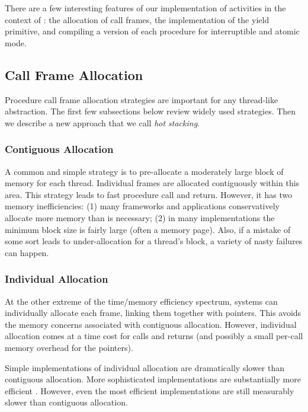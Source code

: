 \documentclass[acmsmall,anonymous,review]{acmart}\settopmatter{printfolios=true,printccs=false,printacmref=false}
\begin{document}
There are a few interesting features of our implementation of activities in the context of \charcoal{}: the allocation of call frames, the implementation of the yield primitive, and compiling a version of each procedure for interruptible and atomic mode.

\subsection{Call Frame Allocation}

Procedure call frame allocation strategies are important for any thread-like abstraction.
The first few subsections below review widely used strategies.
Then we describe a new approach that we call \emph{hot stacking}.

\subsubsection{Contiguous Allocation}

A common and simple strategy is to pre-allocate a moderately large block of memory for each thread.
Individual frames are allocated contiguously within this area.
This strategy leads to fast procedure call and return.
However, it has two memory inefficiencies: (1) many frameworks and applications conservatively allocate more memory than is necessary; (2) in many implementations the minimum block size is fairly large (often a memory page).
Also, if a mistake of some sort leads to under-allocation for a thread's block, a variety of nasty failures can happen.

\subsubsection{Individual Allocation}

At the other extreme of the time/memory efficiency spectrum, systems can individually allocate each frame, linking them together with pointers.
This avoids the memory concerns associated with contiguous allocation.
However, individual allocation comes at a time cost for calls and returns (and possibly a small per-call memory overhead for the pointers).

Simple implementations of individual allocation are dramatically slower than contiguous allocation.
More sophisticated implementations are substantially more efficient \cite{Shao2000}.
However, even the most efficient implementations are still measurably slower than contiguous allocation.
\end{document}
